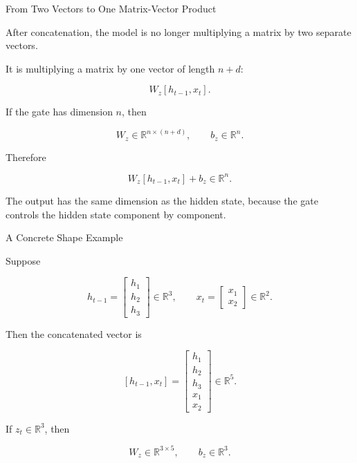 \documentclass[aspectratio=169]{beamer}
\begin{document}
%
%
\begin{frame}{From Two Vectors to One Matrix-Vector Product}

After concatenation, the model is no longer multiplying a matrix by two separate vectors.

\vspace{0.2cm}

It is multiplying a matrix by one vector of length $n+d$:

\[
  W_z [h_{t-1},x_t].
\]

If the gate has dimension $n$, then

\[
  W_z \in \mathbb{R}^{n \times (n+d)},
  \qquad
  b_z \in \mathbb{R}^{n}.
\]

Therefore

\[
  W_z [h_{t-1},x_t] + b_z \in \mathbb{R}^{n}.
\]

The output has the same dimension as the hidden state, because the gate controls the hidden state component by component.

\end{frame}
%
%
\begin{frame}{A Concrete Shape Example}

Suppose

\[
  h_{t-1}
  =
  \begin{bmatrix}
  h_1 \\
  h_2 \\
  h_3
  \end{bmatrix}
  \in \mathbb{R}^{3},
  \qquad
  x_t
  =
  \begin{bmatrix}
  x_1 \\
  x_2
  \end{bmatrix}
  \in \mathbb{R}^{2}.
\]

Then the concatenated vector is

\[
  [h_{t-1}, x_t]
  =
  \begin{bmatrix}
  h_1 \\
  h_2 \\
  h_3 \\
  x_1 \\
  x_2
  \end{bmatrix}
  \in \mathbb{R}^{5}.
\]

If $z_t \in \mathbb{R}^{3}$, then

\[
  W_z \in \mathbb{R}^{3\times 5},
  \qquad
  b_z \in \mathbb{R}^{3}.
\]

\end{frame}
\end{document}
